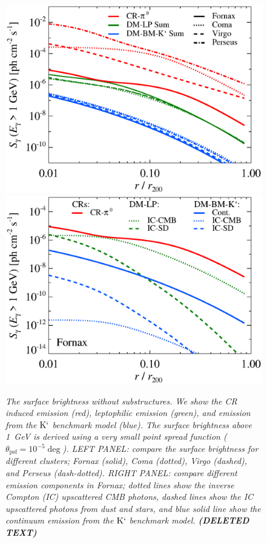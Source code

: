 \documentclass[10pt,aps,pra,reprint,amsmath,amsfonts,amssymb,showpacs]{revtex4-1}
\def\del#1{{\bf (DELETED TEXT)}}
\newcommand{\rmn}{\mathrm}
\newcommand{\Km}{\rmn{K}`}
\begin{document}
\begin{figure}
\begin{minipage}{2.0\columnwidth}
  \includegraphics[width=0.49\columnwidth]{figures/SB.v8.1GeV.SF300.noSuB.elmu.eps}
  \includegraphics[width=0.49\columnwidth]{figures/SB.fornax.v8.1GeV.SF300.noSuB.elmu.eps}
\caption{\it The surface brightness without substructures. We show the
  CR induced emission (red), leptophilic emission (green), and
  emission from the $\Km$ benchmark model (blue). The surface
  brightness above 1~GeV is derived using a very small point spread
  function ($\theta_\rmn{psf}=10^{-5}\deg$). LEFT PANEL: compare the
  surface brightness for different clusters; Fornax (solid), Coma
  (dotted), Virgo (dashed), and Perseus (dash-dotted).  RIGHT PANEL:
  compare different emission components in Fornax; dotted lines show
  the inverse Compton (IC) upscattered CMB photons, dashed lines show
  the IC upscattered photons from dust and stars, and blue solid line
  show the continuum emission from the $\Km$ benchmark
  model. \del{Since cooling is dominated by IR and UV processes in the
    center, the spatial dependence of the equilibrium electron spectra
    cancels the spatial dependence on the upscattered IR photon,
    resulting in a smooth halo dependence (density square) in the
    center. The spatial profile for the upscattered CMB photons is
    flatter in the center since the strong spatial dependence inferred
    from cooling counteracts the smooth halo contribution. Cluster
    outskirts dominated by the emission from DM, although large
    uncertainty in the gas density profile.}}
 \label{fig12}
\end{minipage}
\end{figure}
\end{document}
